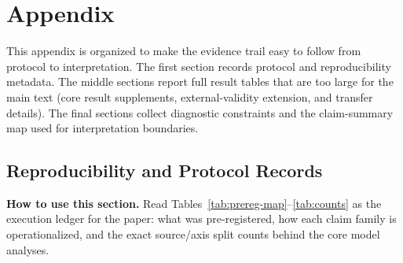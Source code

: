 \section{Appendix}
\setlength{\tabcolsep}{3pt}
\renewcommand{\arraystretch}{1.12}
\sloppy
This appendix is organized to make the evidence trail easy to follow from protocol to interpretation. The first section records protocol and reproducibility metadata. The middle sections report full result tables that are too large for the main text (core result supplements, external-validity extension, and transfer details). The final sections collect diagnostic constraints and the claim-summary map used for interpretation boundaries.

\subsection{Reproducibility and Protocol Records}
\noindent\textbf{How to use this section.} Read Tables~\ref{tab:prereg-map}--\ref{tab:counts} as the execution ledger for the paper: what was pre-registered, how each claim family is operationalized, and the exact source/axis split counts behind the core model analyses.
